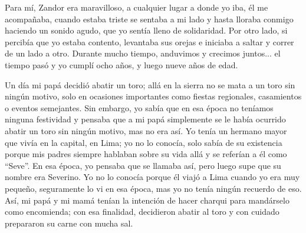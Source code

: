 Para mí, Zandor era maravilloso, a cualquier lugar a donde yo iba, él me acompañaba, cuando estaba triste se sentaba a mi lado y hasta lloraba conmigo haciendo un sonido agudo, que yo sentía lleno de solidaridad.
Por otro lado, si percibía que yo estaba contento, levantaba sus orejas e iniciaba a saltar y correr de un lado a otro. 
Durante mucho tiempo, anduvimos y crecimos juntos... el tiempo pasó y yo cumplí ocho años, y luego nueve años de edad.

Un día mi papá decidió abatir un toro; allá en la sierra no se mata a un toro sin ningún motivo, solo en ocasiones importantes como fiestas regionales, casamientos o eventos semejantes. 
Sin embargo, yo sabía que en esa época no teníamos ninguna festividad y pensaba que a mi papá simplemente se le había ocurrido abatir un toro sin ningún motivo, mas no era así.
Yo tenía un hermano mayor que vivía en la capital, en Lima; yo no lo conocía, solo sabía de su existencia porque mis padres siempre hablaban sobre su vida allá y se referían a él como ``Seve''. 
En esa época, yo pensaba que se llamaba así, pero luego supe que su nombre era Severino. 
Yo no lo conocía porque él viajó a Lima cuando yo era muy pequeño, seguramente lo vi en esa época, mas yo no tenía ningún recuerdo de eso.
Así, mi papá y mi mamá tenían la intención de hacer charqui para mandárselo como encomienda; 
con esa finalidad, decidieron abatir al toro y con cuidado prepararon su carne con mucha sal.

